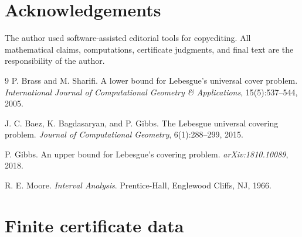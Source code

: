 \documentclass[11pt]{article}
\renewcommand{\arraystretch}{1.14}
\begin{document}
\section*{Acknowledgements}
The author used software-assisted editorial tools for copyediting.  All mathematical claims, computations, certificate judgments, and final text are the responsibility of the author.

{\small
\begin{thebibliography}{9}
\setlength{\itemsep}{1pt}
\setlength{\parskip}{0pt}
P. Brass and M. Sharifi.
A lower bound for Lebesgue's universal cover problem.
\emph{International Journal of Computational Geometry \& Applications}, 15(5):537--544, 2005.

J. C. Baez, K. Bagdasaryan, and P. Gibbs.
The Lebesgue universal covering problem.
\emph{Journal of Computational Geometry}, 6(1):288--299, 2015.

P. Gibbs.
An upper bound for Lebesgue's covering problem.
\emph{arXiv:1810.10089}, 2018.

R. E. Moore.
\emph{Interval Analysis}.
Prentice-Hall, Englewood Cliffs, NJ, 1966.
\end{thebibliography}
}

\clearpage
\appendix
{}
\renewcommand{\arraystretch}{1.15}

\section{Finite certificate data}
\label{app:data}
\end{document}
